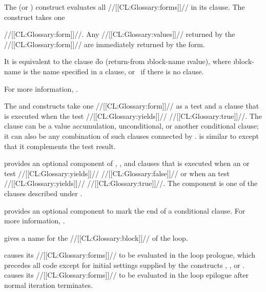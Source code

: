   The  (or ) construct evaluates all //[[CL:Glossary:forms]]// in its clause.
  The  construct takes one  

  //[[CL:Glossary:form]]//. Any //[[CL:Glossary:values]]// returned by the //[[CL:Glossary:form]]// are
  immediately returned by the  form.

   It is equivalent to the clause
   \f{do (return-from \i{block-name} \i{value})},
   where \i{block-name} is the name specified in a 
   clause, or \nil\ if there is no  clause.

For more information, \seesection\LOOPUnconditional.

\endsubsubsubsection%


The  and  constructs take one //[[CL:Glossary:form]]// as a test  and a clause that is executed when the test //[[CL:Glossary:yields]]// //[[CL:Glossary:true]]//. The clause can be a value accumulation, unconditional, or  another conditional clause; it can also be any combination of such clauses connected by .
   is similar to  except that it complements the test result.

 provides an optional component of , , and  clauses that is executed 
     when an  or  test //[[CL:Glossary:yields]]// //[[CL:Glossary:false]]//
  or when an  test //[[CL:Glossary:yields]]// //[[CL:Glossary:true]]//. The component is one of the clauses described under .

 provides an optional component to mark the end of a conditional clause.
  For more information, \seesection\LOOPConditional.

\endsubsubsubsection%

   gives a name for the //[[CL:Glossary:block]]// of the loop.

 causes its //[[CL:Glossary:forms]]// to be evaluated in the loop prologue, which precedes all  code except for initial settings supplied by the constructs , , or .
   causes its //[[CL:Glossary:forms]]// to be evaluated in the loop epilogue after normal iteration terminates. 

